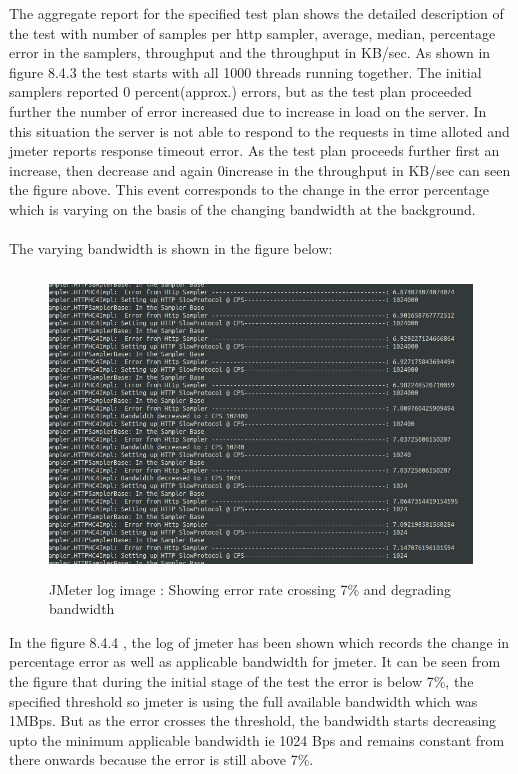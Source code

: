 \documentclass[12pt]{book}
\begin{document}
  
  The aggregate report for the specified test plan shows the detailed description of the test with
  number of samples per http sampler, average, median, percentage error in the samplers,
  throughput and the throughput in KB/sec. As shown in figure 8.4.3 the test starts with all 1000
  threads running together. The initial samplers reported 0 percent(approx.) errors, but as the test
  plan proceeded further the number of error increased due to increase in load on the server. In this
  situation the server is not able to respond to the requests in time alloted and jmeter reports
  response timeout error. As the test plan proceeds further first an increase, then decrease and again
  0increase in the throughput in KB/sec can seen the figure above. This event corresponds to the
  change in the error percentage which is varying on the basis of the changing bandwidth at the
  background.\\
  \\
  The varying bandwidth is shown in the figure below:
  
  \begin{figure}[H]
   \centering
   \includegraphics[width=15cm, height=8cm]{images/dbt_4}
   \caption{JMeter log image : Showing error rate crossing 7\% and degrading bandwidth \label{fig:fig61_JMeter}}
  \end{figure}
 
  In the figure 8.4.4 , the log of jmeter has been shown which records the change in percentage
  error as well as applicable bandwidth for jmeter. It can be seen from the figure that during the
  initial stage of the test the error is below 7\%, the specified threshold so jmeter is using the full
  available bandwidth which was 1MBps. But as the error crosses the threshold, the bandwidth
  starts decreasing upto the minimum applicable bandwidth ie 1024 Bps and remains constant
  from there onwards because the error is still above 7\%.
  
\end{document}
